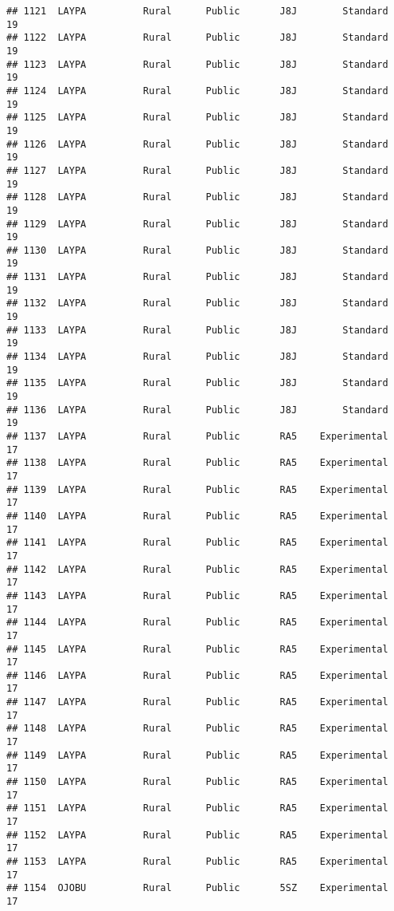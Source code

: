 \documentclass[
]{article}
\begin{document}
\begin{verbatim}
## 1121  LAYPA          Rural      Public       J8J        Standard        19
## 1122  LAYPA          Rural      Public       J8J        Standard        19
## 1123  LAYPA          Rural      Public       J8J        Standard        19
## 1124  LAYPA          Rural      Public       J8J        Standard        19
## 1125  LAYPA          Rural      Public       J8J        Standard        19
## 1126  LAYPA          Rural      Public       J8J        Standard        19
## 1127  LAYPA          Rural      Public       J8J        Standard        19
## 1128  LAYPA          Rural      Public       J8J        Standard        19
## 1129  LAYPA          Rural      Public       J8J        Standard        19
## 1130  LAYPA          Rural      Public       J8J        Standard        19
## 1131  LAYPA          Rural      Public       J8J        Standard        19
## 1132  LAYPA          Rural      Public       J8J        Standard        19
## 1133  LAYPA          Rural      Public       J8J        Standard        19
## 1134  LAYPA          Rural      Public       J8J        Standard        19
## 1135  LAYPA          Rural      Public       J8J        Standard        19
## 1136  LAYPA          Rural      Public       J8J        Standard        19
## 1137  LAYPA          Rural      Public       RA5    Experimental        17
## 1138  LAYPA          Rural      Public       RA5    Experimental        17
## 1139  LAYPA          Rural      Public       RA5    Experimental        17
## 1140  LAYPA          Rural      Public       RA5    Experimental        17
## 1141  LAYPA          Rural      Public       RA5    Experimental        17
## 1142  LAYPA          Rural      Public       RA5    Experimental        17
## 1143  LAYPA          Rural      Public       RA5    Experimental        17
## 1144  LAYPA          Rural      Public       RA5    Experimental        17
## 1145  LAYPA          Rural      Public       RA5    Experimental        17
## 1146  LAYPA          Rural      Public       RA5    Experimental        17
## 1147  LAYPA          Rural      Public       RA5    Experimental        17
## 1148  LAYPA          Rural      Public       RA5    Experimental        17
## 1149  LAYPA          Rural      Public       RA5    Experimental        17
## 1150  LAYPA          Rural      Public       RA5    Experimental        17
## 1151  LAYPA          Rural      Public       RA5    Experimental        17
## 1152  LAYPA          Rural      Public       RA5    Experimental        17
## 1153  LAYPA          Rural      Public       RA5    Experimental        17
## 1154  OJOBU          Rural      Public       5SZ    Experimental        17

\end{verbatim}
\end{document}
